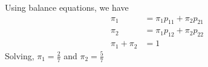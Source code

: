 \documentclass[../../probability-notes.tex]{subfile}
\begin{document}
        Using balance equations, we have
        \begin{align*}
            \pi_{1} &= \pi_{1}p_{11} + \pi_{2}p_{21}\\
            \pi_{2} &= \pi_{1}p_{12} + \pi_{2}p_{22}\\
            \pi_{1} + \pi_{2} &= 1
        \end{align*}
        Solving, $\pi_{1} = \frac{2}{7}$ and $\pi_{2} = \frac{5}{7}$
\end{document}
